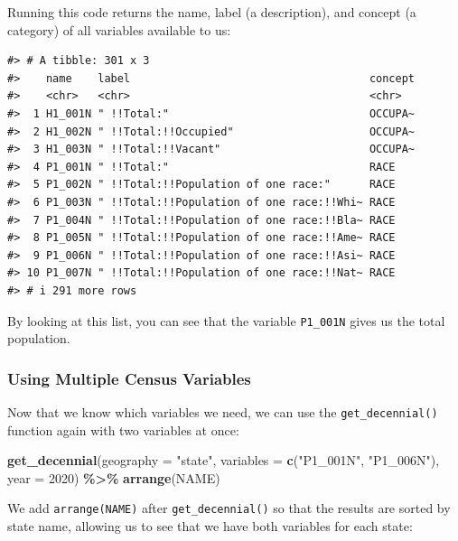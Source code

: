 \documentclass[
]{book}
\newenvironment{Shaded}{\begin{snugshade}}{\end{snugshade}}
\newcommand{\AttributeTok}[1]{\textcolor[rgb]{0.13,0.29,0.53}{#1}}
\newcommand{\DecValTok}[1]{\textcolor[rgb]{0.00,0.00,0.81}{#1}}
\newcommand{\FunctionTok}[1]{\textcolor[rgb]{0.13,0.29,0.53}{\textbf{#1}}}
\newcommand{\NormalTok}[1]{#1}
\newcommand{\SpecialCharTok}[1]{\textcolor[rgb]{0.81,0.36,0.00}{\textbf{#1}}}
\newcommand{\StringTok}[1]{\textcolor[rgb]{0.31,0.60,0.02}{#1}}
\begin{document}
Running this code returns the name, label (a description), and concept (a category) of all variables available to us:

\begin{verbatim}
#> # A tibble: 301 x 3
#>    name    label                                     concept
#>    <chr>   <chr>                                     <chr>  
#>  1 H1_001N " !!Total:"                               OCCUPA~
#>  2 H1_002N " !!Total:!!Occupied"                     OCCUPA~
#>  3 H1_003N " !!Total:!!Vacant"                       OCCUPA~
#>  4 P1_001N " !!Total:"                               RACE   
#>  5 P1_002N " !!Total:!!Population of one race:"      RACE   
#>  6 P1_003N " !!Total:!!Population of one race:!!Whi~ RACE   
#>  7 P1_004N " !!Total:!!Population of one race:!!Bla~ RACE   
#>  8 P1_005N " !!Total:!!Population of one race:!!Ame~ RACE   
#>  9 P1_006N " !!Total:!!Population of one race:!!Asi~ RACE   
#> 10 P1_007N " !!Total:!!Population of one race:!!Nat~ RACE   
#> # i 291 more rows
\end{verbatim}

By looking at this list, you can see that the variable \texttt{P1\_001N} gives us the total population.

\hypertarget{using-multiple-census-variables}{%
\subsubsection*{Using Multiple Census Variables}\label{using-multiple-census-variables}}

Now that we know which variables we need, we can use the \texttt{get\_decennial()} function again with two variables at once:

\begin{Shaded}
\begin{Highlighting}[]
\FunctionTok{get\_decennial}\NormalTok{(}\AttributeTok{geography =} \StringTok{"state"}\NormalTok{, }
              \AttributeTok{variables =} \FunctionTok{c}\NormalTok{(}\StringTok{"P1\_001N"}\NormalTok{, }\StringTok{"P1\_006N"}\NormalTok{),}
              \AttributeTok{year =} \DecValTok{2020}\NormalTok{) }\SpecialCharTok{\%\textgreater{}\%} 
  \FunctionTok{arrange}\NormalTok{(NAME)}
\end{Highlighting}
\end{Shaded}

We add \texttt{arrange(NAME)} after \texttt{get\_decennial()} so that the results are sorted by state name, allowing us to see that we have both variables for each state:
\end{document}
